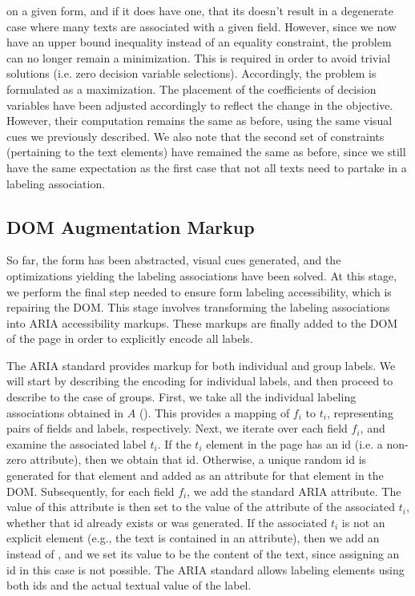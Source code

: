 on a given form, and if it does have one, that its doesn't result 
in a degenerate case where many texts are associated with a given 
field. However, since we now have an upper bound inequality 
instead of an equality constraint, the problem can no longer 
remain a minimization. This is required in order to avoid trivial 
solutions (i.e. zero decision variable selections). Accordingly, 
the problem is formulated as a maximization. The placement of 
the coefficients of decision variables have been adjusted accordingly 
to reflect the change in the objective. However, their computation 
remains the same as before, using the same visual cues we previously 
described. We also note that the second set of constraints 
(pertaining to the text elements) have remained the same as before, 
since we still have the same expectation as the first case that 
not all texts need to partake in a labeling association. 

\subsection{DOM Augmentation Markup}
So far, the form has been abstracted, visual cues generated, and 
the optimizations yielding the labeling associations have been 
solved. At this stage, we perform the final step needed to ensure 
form labeling accessibility, which is repairing the DOM. 
This stage involves transforming the labeling associations into 
ARIA accessibility markups. These markups are finally added to 
the DOM of the page in order to explicitly encode all labels.  

The ARIA standard provides markup for both individual and group 
labels. We will start by describing the encoding for individual 
labels, and then proceed to describe to the case of groups. 
First, we take all the individual labeling associations obtained in 
$A$ ().  This provides a mapping of $f_i$ to $t_i$, 
representing pairs of fields and labels, respectively. Next, we 
iterate over each field $f_i$, and examine the associated label 
$t_i$. If the $t_i$ element in the page has an id (i.e. a non-zero 
 attribute), then we obtain that id. Otherwise, a unique 
random id is generated for that element and added as an  
attribute for that element in the DOM. Subsequently, for each field 
$f_i$, we add the  standard ARIA attribute. 
The value of this attribute is then set to the value of the  
attribute of the associated $t_i$, whether that id already exists 
or was generated. If the associated $t_i$ is not an explicit element 
(e.g., the text is contained in an attribute), then we add an 
 instead of , and we set its 
value to be the content of the text, since assigning an id in this 
case is not possible. The ARIA standard allows labeling elements 
using both ids and the actual textual value of the label. 

